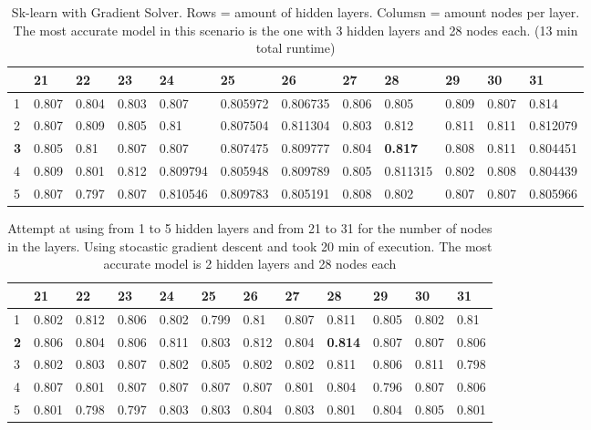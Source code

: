 \documentclass{article}
\begin{document}
\begin{table}[]
\caption{Sk-learn with Gradient Solver. Rows = amount of hidden layers. Columsn = amount nodes per layer. The most accurate model in this scenario is the one with 3 hidden layers and 28 nodes each. (13 min total runtime)}
\label{tab:Experiment_Scaled_Gradient}
\begin{tabular}{|l|l|l|l|l|l|l|l|l|l|l|l|}
\hline
           & 21       & 22       & 23       & 24       & 25       & 26       & 27       & \textbf{28}       & 29       & 30       & 31       \\ \hline
1          & 0.807 & 0.804 & 0.803 & 0.807 & 0.805972 & 0.806735 & 0.806 & 0.805          & 0.809 & 0.807 & 0.814 \\ \hline
2          & 0.807 & 0.809 & 0.805 & 0.81 & 0.807504 & 0.811304 & 0.803 & 0.812          & 0.811 & 0.811 & 0.812079 \\ \hline
\textbf{3} & 0.805 & 0.81 & 0.807 & 0.807 & 0.807475 & 0.809777 & 0.804 & \textbf{0.817} & 0.808 & 0.811 & 0.804451 \\ \hline
4          & 0.809 & 0.801 & 0.812 & 0.809794 & 0.805948 & 0.809789 & 0.805 & 0.811315          & 0.802 & 0.808 & 0.804439 \\ \hline
5          & 0.807 & 0.797 & 0.807 & 0.810546 & 0.809783 & 0.805191 & 0.808 & 0.802          & 0.807 & 0.807 & 0.805966 \\ \hline
\end{tabular}
\end{table}

\begin{table}[]
\caption{Attempt at using from 1 to 5 hidden layers and from 21 to 31 for the number of nodes in the layers. Using stocastic gradient descent and took 20 min of execution.
The most  accurate model is 2 hidden layers and 28 nodes each}
\label{tab:Scaled_gradient}
\begin{tabular}{|l|l|l|l|l|l|l|l|l|l|l|l|}
\hline
           & 21    & 22    & 23    & 24    & 25    & 26    & 27    & \textbf{28}    & 29    & 30    & 31    \\ \hline
1          & 0.802 & 0.812 & 0.806 & 0.802 & 0.799 & 0.81  & 0.807 & 0.811          & 0.805 & 0.802 & 0.81  \\ \hline
\textbf{2} & 0.806 & 0.804 & 0.806 & 0.811 & 0.803 & 0.812 & 0.804 & \textbf{0.814} & 0.807 & 0.807 & 0.806 \\ \hline
3          & 0.802 & 0.803 & 0.807 & 0.802 & 0.805 & 0.802 & 0.802 & 0.811          & 0.806 & 0.811 & 0.798 \\ \hline
4          & 0.807 & 0.801 & 0.807 & 0.807 & 0.807 & 0.807 & 0.801 & 0.804          & 0.796 & 0.807 & 0.806 \\ \hline
5          & 0.801 & 0.798 & 0.797 & 0.803 & 0.803 & 0.804 & 0.803 & 0.801          & 0.804 & 0.805 & 0.801 \\ \hline
\end{tabular}
\end{table}
\end{document}
